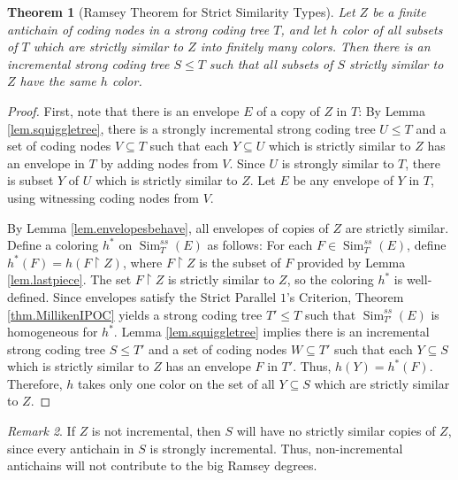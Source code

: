 \documentclass{amsart}
\newtheorem{thm}{Theorem}[section]
\theoremstyle{remark}
\newtheorem{rem}[thm]{Remark}
\theoremstyle{definition}
\theoremstyle{remark}
\newcommand{\sse}{\subseteq}
\DeclareMathOperator{\Sim}{Sim}
\newcommand{\re}{\restriction}
\newcommand{\SPOC}{Strict Parallel $1$'s Criterion}
\begin{document}





\begin{thm}[Ramsey Theorem for Strict Similarity Types]\label{thm.mainRamsey}
Let $Z$ be a finite antichain of coding nodes in   a strong coding tree $T$,
and let $h$  color of all subsets of $T$ which are strictly similar to $Z$ into finitely many colors.
Then there is an incremental strong coding tree $S\le T$ such that
all subsets of $S$ strictly similar to $Z$ have the same $h$ color.
\end{thm}


\begin{proof}
First, note that there is an envelope $E$
of a copy of $Z$ in $T$:
By  Lemma \ref{lem.squiggletree},
 there is a strongly incremental strong coding tree $U\le T$ and a set of coding nodes $V\sse T$
such that each  $Y\sse U$  which is strictly similar to $Z$
has an envelope  in $T$ by adding nodes from $V$.
Since $U$ is strongly similar to $T$,
there is  subset $Y$ of $U$ which is  strictly similar  to  $Z$.
Let
$E$ be any envelope of $Y$ in $T$, using witnessing coding nodes from $V$.




By Lemma \ref{lem.envelopesbehave}, all envelopes of copies of $Z$ are strictly similar.
Define a coloring $h^*$ on $\Sim^{ss}_T(E)$ as follows:
For each $F\in \Sim^{ss}_T(E)$,
define
$h^*(F)=h(F\re Z)$,
where
 $F\re Z$ is  the  subset of $F$ provided by Lemma \ref{lem.lastpiece}.
The set $F\re Z$
is strictly similar to $Z$,
so  the coloring $h^*$ is well-defined.
Since  envelopes satisfy the \SPOC,
Theorem \ref{thm.MillikenIPOC}
yields
a strong coding tree $T'\le T$ such that $\Sim^{ss}_{T'}(E)$  is homogeneous for $h^*$.
 Lemma \ref{lem.squiggletree} implies there is an incremental strong coding tree $S\le T'$ and a set of coding nodes $W\sse T'$
such that each  $Y\sse S$  which is strictly similar to $Z$
has an envelope $F$ in $T'$.
Thus, $h(Y)=h^*(F)$.
Therefore, $h$ takes only one color on the set of all $Y\sse S$ which are strictly similar to $Z$.
\end{proof}



\begin{rem}
If $Z$ is not incremental, then $S$ will have no strictly similar copies of $Z$, since every antichain in $S$ is strongly incremental.
Thus, non-incremental antichains will not contribute to the big Ramsey degrees.
\end{rem}
\end{document}
